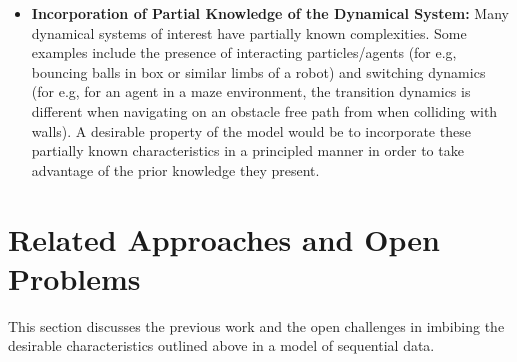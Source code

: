 \documentclass[10pt,twocolumn,letterpaper]{article}
\begin{document}
\begin{itemize}
		\item \textbf{Incorporation of Partial Knowledge of the Dynamical System:} Many dynamical systems of interest have partially known complexities. Some examples include the presence of interacting particles/agents (for e.g, bouncing balls in box or similar limbs of a robot) and switching dynamics (for e.g, for an agent in a maze environment, the transition dynamics is different when navigating on an obstacle free path from when colliding with walls). A desirable property of the model would be to incorporate these partially known characteristics in a principled manner in order to take advantage of the prior knowledge they present.
	\end{itemize}
	
	\section{Related Approaches and Open Problems}
	This section discusses the previous work and the open challenges in imbibing the  desirable characteristics outlined above in a model of sequential data.
	
\end{document}
